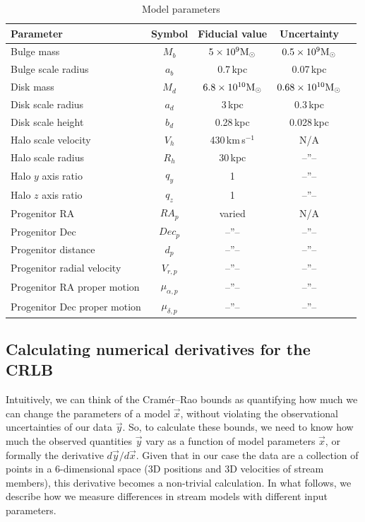 \documentclass[modern]{aastex61}
\newcommand{\acronym}[1]{{\small{#1}}}
\newcommand{\CRLB}{\acronym{CRLB}}
\begin{document}
\begin{table}
\begin{center}
\begin{tabular}{l c c c l}
\hline
\hline
Parameter & Symbol & Fiducial value & Uncertainty \\
\hline
\hline
Bulge mass & $M_b$ & $5\times10^{9}\rm M_\odot$ & $0.5\times10^{9}\rm M_\odot$ \\
Bulge scale radius & $a_b$ & 0.7\,kpc & 0.07\,kpc \\
Disk mass & $M_d$ & $6.8\times10^{10}\rm M_\odot$ & $0.68\times10^{10}\rm M_\odot$ \\
Disk scale radius & $a_d$ & 3\,kpc & 0.3\,kpc\\
Disk scale height & $b_d$ & 0.28\,kpc& 0.028\,kpc \\
\hline
Halo scale velocity & $V_h$ & 430\,km\,s$^{-1}$ & N/A \\
Halo scale radius & $R_h$ & 30\,kpc & --''-- \\
Halo $y$ axis ratio & $q_y$ & 1 & --''-- \\
Halo $z$ axis ratio & $q_z$ & 1 & --''-- \\
\hline
Progenitor RA & $RA_p$ & varied & N/A \\
Progenitor Dec & $Dec_p$ & --''-- & --''-- \\
Progenitor distance & $d_p$ & --''-- & --''-- \\
Progenitor radial velocity & $V_{r,p}$ & --''-- & --''-- \\
Progenitor RA proper motion & $\mu_{\alpha,p}$ & --''-- & --''-- \\
Progenitor Dec proper motion & $\mu_{\delta,p}$ & --''-- & --''-- \\
\hline
\hline
\end{tabular}
\caption{Model parameters}
\label{t:model}
\end{center}
\end{table}


\subsection{Calculating numerical derivatives for the \CRLB}
\label{sec:derivatives}
Intuitively, we can think of the Cram\'er--Rao bounds as quantifying how much we can change the parameters of a model $\vec{x}$, without violating the observational uncertainties of our data $\vec{y}$.
So, to calculate these bounds, we need to know how much the observed quantities $\vec{y}$ vary as a function of model parameters $\vec{x}$, or formally the derivative $d\vec{y}/d\vec{x}$.
Given that in our case the data are a collection of points in a 6-dimensional space (3D positions and 3D velocities of stream members), this derivative becomes a non-trivial calculation.
In what follows, we describe how we measure differences in stream models with different input parameters.
\end{document}
